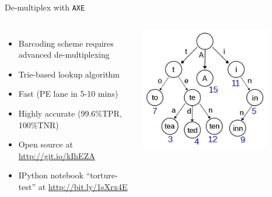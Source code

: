 \documentclass{beamer}
\begin{document}
\begin{frame}{De-multiplex with \texttt{AXE}}
  \begin{columns}[b]
    \begin{itemize}
      \item Barcoding scheme requires advanced de-multiplexing
      \item Trie-based lookup algorithm
      \item Fast (PE lane in 5-10 mins)
      \item Highly accurate (99.6\%TPR, 100\%TNR)
      \item Open source at \url{http://git.io/kIhEZA}
      \item IPython notebook ``torture-test'' at \url{http://bit.ly/1sXrx4E}
    \end{itemize}
    \includegraphics[width=0.8\textwidth]{img/trie.png}
  \end{columns}
  \vfill
\end{frame}
\end{document}
